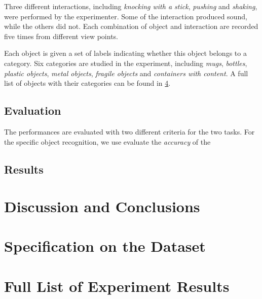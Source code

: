 \documentclass[12pt,final,twoside]{report}
\begin{document}
Three different interactions, including \emph{knocking with a stick}, \emph{pushing} and \emph{shaking}, were performed by the experimenter. Some of the interaction produced sound, while the others did not. Each combination of object and interaction are recorded five times from different view points. 

Each object is given a set of labels indicating whether this object belongs to a category. Six categories are studied in the experiment, including \emph{mugs}, \emph{bottles}, \emph{plastic objects}, \emph{metal objects}, \emph{fragile objects} and \emph{containers with content}.  
A full list of objects with their categories can be found in \cref{app:dataset}. 

\section{Evaluation}
The performances are evaluated with two different criteria for the two tasks. 
For the specific object recognition, we use evaluate the \emph{accuracy} of the 


\section{Results}

\cleardoublepage
\chapter{Discussion and Conclusions}

\cleardoublepage
\appendix
\fancyhead[LO,RE]{}                      %

\chapter{Specification on the Dataset}
\label{app:dataset}

\cleardoublepage

\chapter{Full List of Experiment Results}
\label{app:results}

\cleardoublepage
\end{document}
